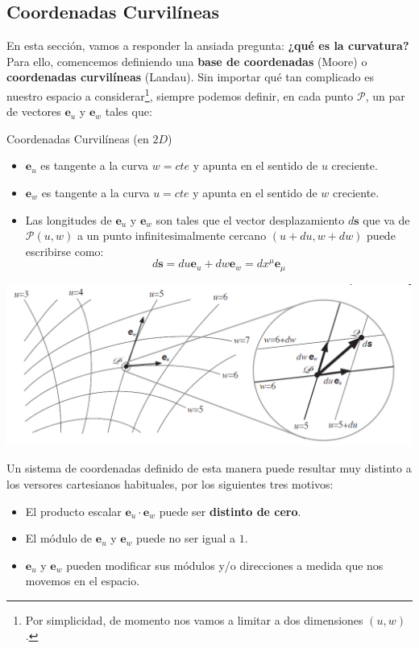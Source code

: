 \subsection*{\textbf{Coordenadas Curvilíneas}}
En esta sección, vamos a responder la ansiada pregunta: \textbf{¿qué es la curvatura?} Para ello, comencemos definiendo una \textbf{base de coordenadas} (Moore) o \textbf{coordenadas curvilíneas} (Landau). Sin importar qué tan complicado es nuestro espacio a considerar\footnote{Por simplicidad, de momento nos vamos a limitar a dos dimensiones $(u,w)$.}, siempre podemos definir\cite[][p.54]{moore}, en cada punto $\mathcal{P}$, un par de vectores $\mathbf{e}_u$ y $\mathbf{e}_w$ tales que:
\vspace{1cm}
\begin{fullwidth}
\begin{remarkbox}{Coordenadas Curvilíneas (en $2D$)}
\begin{itemize}
    \item $\mathbf{e}_u$ es tangente a la curva $w=cte$ y apunta en el sentido de $u$ creciente.
    \item $\mathbf{e}_w$ es tangente a la curva $u=cte$ y apunta en el sentido de $w$ creciente.
    \item Las longitudes de $\mathbf{e}_u$ y $\mathbf{e}_w$ son tales que el vector desplazamiento $d \mathbf{s}$ que va de $\mathcal{P}(u,w)$ a un punto infinitesimalmente cercano $(u+du,w+dw)$ puede escribirse como:
    $$d\mathbf{s}=du\mathbf{e}_u+dw\mathbf{e}_w=dx^{\mu}\mathbf{e}_{\mu}$$
\end{itemize}
\includegraphics[width=1\textwidth]{Im/coord.png}
    \label{fig:sen}
\end{remarkbox}
\end{fullwidth}
Un sistema de coordenadas definido de esta manera puede resultar muy distinto a los versores cartesianos habituales, por los siguientes tres motivos: 

\begin{itemize}
    \item El producto escalar $\mathbf{e}_u \cdot \mathbf{e}_w$ puede ser \textbf{distinto de cero}.
    \item El módulo de $\mathbf{e}_u$ y $\mathbf{e}_w$ puede no ser igual a $1$.
    \item $\mathbf{e}_u$ y $\mathbf{e}_w$ pueden modificar sus módulos y/o direcciones a medida que nos movemos en el espacio.
\end{itemize}

